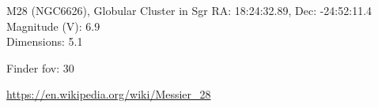 \begin{block}{M28 (NGC6626), Globular Cluster in Sgr}
    RA: 18:24:32.89, Dec: -24:52:11.4 \\ 
    Magnitude (V): 6.9 \\ 
    Dimensions: 5.1 

    Finder fov: 30 

    \url{https://en.wikipedia.org/wiki/Messier_28} 
\end{block}